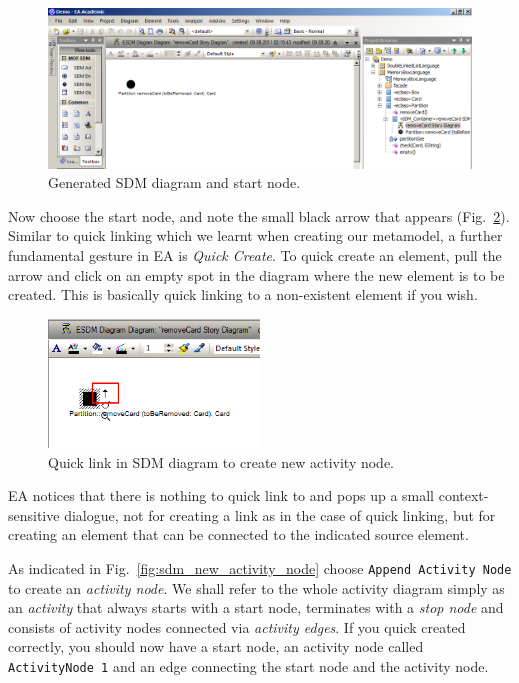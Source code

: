 \begin{figure}[htp]
\begin{center}
  \includegraphics[width=\textwidth]{pics/sdmBilder/removeCard/sdm02RAW}
  \caption{Generated SDM diagram and start node.}  
  \label{fig:sdm_skeleton}
\end{center}
\end{figure}

Now choose the start node, and note the small black arrow that appears
(Fig.~\ref{fig:sdm_quicklink}).  Similar to quick linking which we learnt when
creating our metamodel, a further fundamental gesture in EA is \emph{Quick
Create}. To quick create an element, pull the arrow and click on an empty spot
in the diagram where the new element is to be created.  This is basically quick
linking to a non-existent element if you wish.

\begin{figure}[htp]
\begin{center}
  \includegraphics[width=0.5\textwidth]{pics/sdmBilder/removeCard/sdm03RAW}
  \caption{Quick link in SDM diagram to create new activity node.}  
  \label{fig:sdm_quicklink}
\end{center}
\end{figure}

EA notices that there is nothing to quick link to and pops up a small
context-sensitive dialogue, not for creating a link as in the case of quick
linking, but for creating an element that can be connected to the
indicated source element. 

As indicated in Fig.~\ref{fig:sdm_new_activity_node}
choose \texttt{Append Activity Node} to create an \emph{activity node}.  We
shall refer to the whole activity diagram simply as an \emph{activity} that
always starts with a start node, terminates with a \emph{stop node} and consists
of activity nodes connected via \emph{activity edges}.  If you quick created
correctly, you should now have a start node, an activity node called
\texttt{ActivityNode 1} and an edge connecting the start node and the activity
node.

